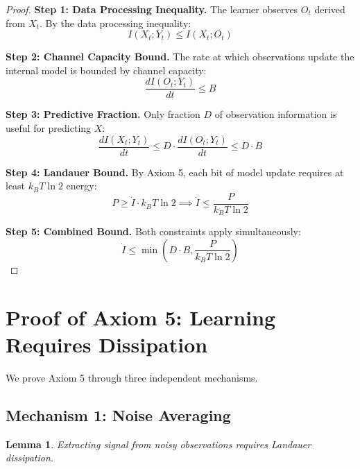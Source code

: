 \documentclass{article}
\newtheorem{lemma}[theorem]{Lemma}
\begin{document}
\begin{proof}
\textbf{Step 1: Data Processing Inequality.}
The learner observes $O_t$ derived from $X_t$. By the data processing inequality:
\begin{equation}
I(X_t; Y_t) \leq I(X_t; O_t)
\end{equation}

\textbf{Step 2: Channel Capacity Bound.}
The rate at which observations update the internal model is bounded by channel capacity:
\begin{equation}
\frac{dI(O_t; Y_t)}{dt} \leq B
\end{equation}

\textbf{Step 3: Predictive Fraction.}
Only fraction $D$ of observation information is useful for predicting $X$:
\begin{equation}
\frac{dI(X_t; Y_t)}{dt} \leq D \cdot \frac{dI(O_t; Y_t)}{dt} \leq D \cdot B
\end{equation}

\textbf{Step 4: Landauer Bound.}
By Axiom 5, each bit of model update requires at least $k_B T \ln 2$ energy:
\begin{equation}
P \geq \dot{I} \cdot k_B T \ln 2 \implies \dot{I} \leq \frac{P}{k_B T \ln 2}
\end{equation}

\textbf{Step 5: Combined Bound.}
Both constraints apply simultaneously:
\begin{equation}
\dot{I} \leq \min\left(D \cdot B, \frac{P}{k_B T \ln 2}\right)
\end{equation}
\end{proof}

\section{Proof of Axiom 5: Learning Requires Dissipation}
\label{sec:axiom5proof}

We prove Axiom 5 through three independent mechanisms.

\subsection{Mechanism 1: Noise Averaging}

\begin{lemma}
Extracting signal from noisy observations requires Landauer dissipation.
\end{lemma}
\end{document}
